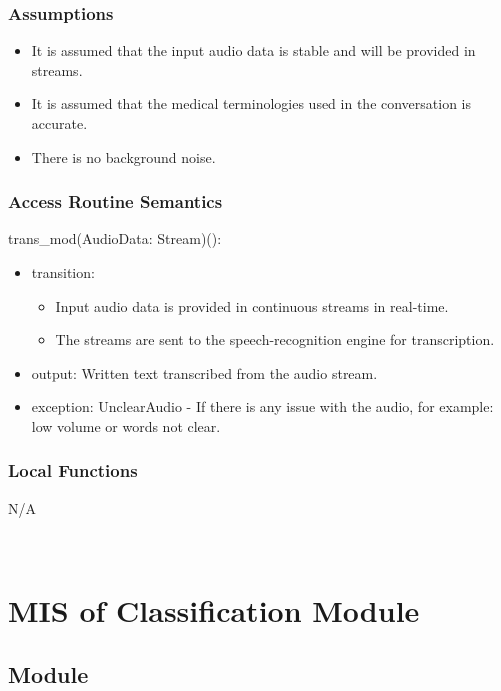 \documentclass[12pt, titlepage]{article}
\begin{document}
\subsubsection{Assumptions}

\begin{itemize}
  \item It is assumed that the input audio data is stable and will be provided in streams.
  \item It is assumed that the medical terminologies used in the conversation is accurate.
  \item There is no background noise.
\end{itemize}

\subsubsection{Access Routine Semantics}

\noindent trans\_mod(AudioData: Stream)(): 
\begin{itemize}
\item transition:
\begin{itemize}
  \item Input audio data is provided in continuous streams in real-time.
  \item The streams are sent to the speech-recognition engine for transcription.
\end{itemize} 
\item output: Written text transcribed from the audio stream. 
\item exception: UnclearAudio - If there is any issue with the audio, for example: low volume or words not clear.  
\end{itemize}

\subsubsection{Local Functions}

N/A

\newpage
~\newpage
  
\section{MIS of Classification Module} \label{Classify} 

\subsection{Module}
\end{document}
